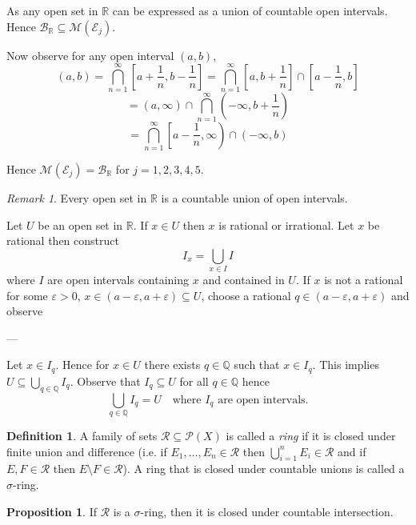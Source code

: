 \documentclass[11pt]{article}
\theoremstyle{definition}
\newtheorem{definition}{Definition}[section]
\newtheorem{proposition}{Proposition}[section]
\theoremstyle{remark}
\newtheorem{remark}{Remark}[section]
\begin{document}
As any open set in $\mathbb{R}$ can be expressed as a union of countable open intervals. Hence $\mathcal{B}_{\mathbb{R}} \subseteq \mathcal{M}(\mathcal{E}_j)$.

Now observe for any open interval $(a,b)$,
\[
(a,b) = \bigcap_{n=1}^\infty \left[a + \frac{1}{n}, b - \frac{1}{n}\right] = \bigcap_{n=1}^\infty \left[a, b + \frac{1}{n}\right] \cap \left[a - \frac{1}{n}, b\right]
\]
\[
= (a, \infty) \cap \bigcap_{n=1}^\infty \left(-\infty, b + \frac{1}{n}\right)
\]
\[
= \bigcap_{n=1}^\infty \left[a - \frac{1}{n}, \infty\right) \cap (-\infty, b)
\]

Hence $\mathcal{M}(\mathcal{E}_j) = \mathcal{B}_{\mathbb{R}}$ for $j = 1, 2, 3, 4, 5$.

\begin{remark}\label{rem:open_sets_intervals}
Every open set in $\mathbb{R}$ is a countable union of open intervals.
\end{remark}

Let $U$ be an open set in $\mathbb{R}$. If $x \in U$ then $x$ is rational or irrational. Let $x$ be rational then construct
\[
I_x = \bigcup_{x \in I} I
\]
where $I$ are open intervals containing $x$ and contained in $U$. If $x$ is not a rational for some $\varepsilon > 0$, $x \in (a - \varepsilon, a + \varepsilon) \subseteq U$, choose a rational $q \in (a - \varepsilon, a + \varepsilon)$ and observe

---

Let $x \in I_q$. Hence for $x \in U$ there exists $q \in \mathbb{Q}$ such that $x \in I_q$. This implies $U \subseteq \bigcup_{q \in \mathbb{Q}} I_q$. Observe that $I_q \subseteq U$ for all $q \in \mathbb{Q}$ hence
\[
\bigcup_{q \in \mathbb{Q}} I_q = U \quad \text{where } I_q \text{ are open intervals.}
\]

\begin{definition}\label{def:ring}
A family of sets $\mathcal{R} \subseteq \mathcal{P}(X)$ is called a \emph{ring} if it is closed under finite union and difference (i.e. if $E_1, \dots, E_n \in \mathcal{R}$ then $\bigcup_{i=1}^n E_i \in \mathcal{R}$ and if $E, F \in \mathcal{R}$ then $E \setminus F \in \mathcal{R}$).
A ring that is closed under countable unions is called a $\sigma$-ring.
\end{definition}

\begin{proposition}\label{prop:sigma_ring_intersection}
If $\mathcal{R}$ is a $\sigma$-ring, then it is closed under countable intersection.
\end{proposition}
\end{document}
